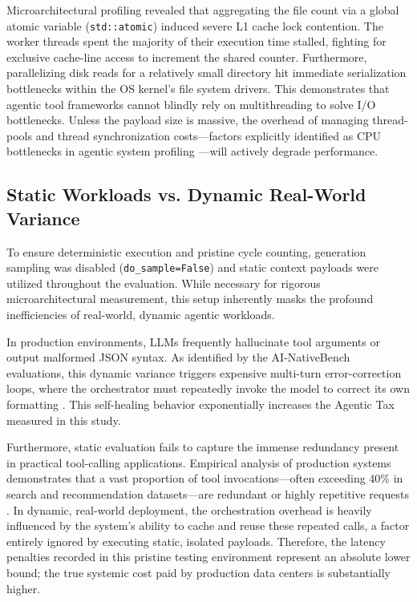 \documentclass[10pt, letterpaper]{article}
\begin{document}
Microarchitectural profiling revealed that aggregating the file count via a global atomic variable (\texttt{std::atomic}) induced severe L1 cache lock contention. The worker threads spent the majority of their execution time stalled, fighting for exclusive cache-line access to increment the shared counter. Furthermore, parallelizing disk reads for a relatively small directory hit immediate serialization bottlenecks within the OS kernel's file system drivers. This demonstrates that agentic tool frameworks cannot blindly rely on multithreading to solve I/O bottlenecks. Unless the payload size is massive, the overhead of managing thread-pools and thread synchronization costs---factors explicitly identified as CPU bottlenecks in agentic system profiling \cite{cpu_centric}---will actively degrade performance. 

\subsection{Static Workloads vs. Dynamic Real-World Variance}
To ensure deterministic execution and pristine cycle counting, generation sampling was disabled (\texttt{do\_sample=False}) and static context payloads were utilized throughout the evaluation. While necessary for rigorous microarchitectural measurement, this setup inherently masks the profound inefficiencies of real-world, dynamic agentic workloads.

In production environments, LLMs frequently hallucinate tool arguments or output malformed JSON syntax. As identified by the AI-NativeBench evaluations, this dynamic variance triggers expensive multi-turn error-correction loops, where the orchestrator must repeatedly invoke the model to correct its own formatting \cite{ai_nativebench}. This self-healing behavior exponentially increases the Agentic Tax measured in this study. 

Furthermore, static evaluation fails to capture the immense redundancy present in practical tool-calling applications. Empirical analysis of production systems demonstrates that a vast proportion of tool invocations---often exceeding 40\% in search and recommendation datasets---are redundant or highly repetitive requests \cite{toolcaching}. In dynamic, real-world deployment, the orchestration overhead is heavily influenced by the system's ability to cache and reuse these repeated calls, a factor entirely ignored by executing static, isolated payloads. Therefore, the latency penalties recorded in this pristine testing environment represent an absolute lower bound; the true systemic cost paid by production data centers is substantially higher.
\end{document}
